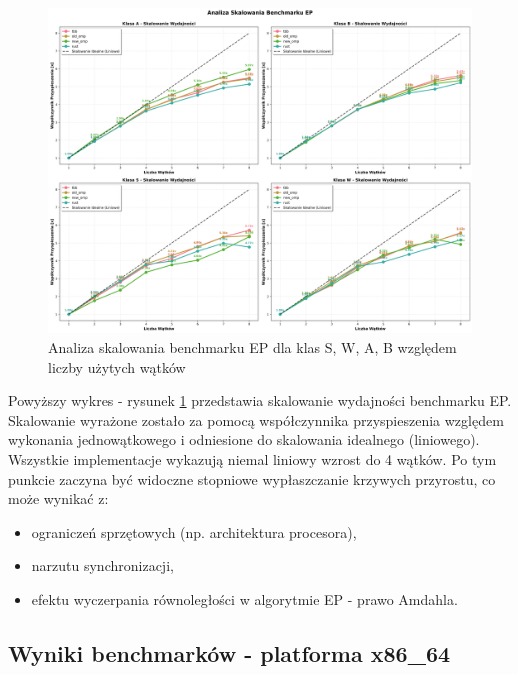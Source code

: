 \begin{figure}[H]
    \centering
    \includegraphics[width=\textwidth]{analiza/images/parallel/ep/ep_analiza_skalowania.png}
    \caption{Analiza skalowania benchmarku EP dla klas S, W, A, B względem liczby użytych wątków}
    \label{ep_analiza_skalowania}
\end{figure}
Powyższy wykres - rysunek \ref{ep_analiza_skalowania} przedstawia skalowanie wydajności benchmarku EP. Skalowanie wyrażone zostało za pomocą współczynnika przyspieszenia względem wykonania jednowątkowego i odniesione do skalowania idealnego (liniowego).
Wszystkie implementacje wykazują niemal liniowy wzrost do 4 wątków. Po tym punkcie zaczyna być widoczne stopniowe wypłaszczanie krzywych przyrostu, co może wynikać z:
\begin{itemize}
    \item ograniczeń sprzętowych (np. architektura procesora),
    \item narzutu synchronizacji,
    \item efektu wyczerpania równoległości w algorytmie EP - prawo Amdahla.
\end{itemize}


\subsection{Wyniki benchmarków - platforma x86\_64}

